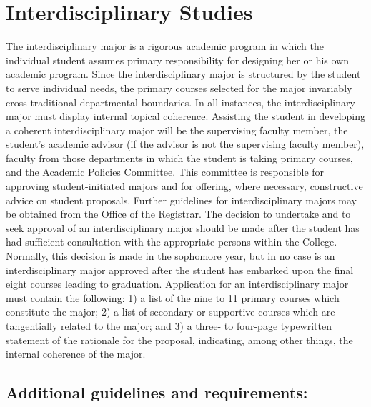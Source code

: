 \documentclass[
  letterpaper,
]{scrbook}
\begin{document}
\section{Interdisciplinary Studies}\label{sec-interdisciplinary-studies}

The interdisciplinary major is a rigorous academic program in which the
individual student assumes primary responsibility for designing her or
his own academic program. Since the interdisciplinary major is
structured by the student to serve individual needs, the primary courses
selected for the major invariably cross traditional departmental
boundaries. In all instances, the interdisciplinary major must display
internal topical coherence. Assisting the student in developing a
coherent interdisciplinary major will be the supervising faculty member,
the student's academic advisor (if the advisor is not the supervising
faculty member), faculty from those departments in which the student is
taking primary courses, and the Academic Policies Committee. This
committee is responsible for approving student-initiated majors and for
offering, where necessary, constructive advice on student proposals.
Further guidelines for interdisciplinary majors may be obtained from the
Office of the Registrar. The decision to undertake and to seek approval
of an interdisciplinary major should be made after the student has had
sufficient consultation with the appropriate persons within the College.
Normally, this decision is made in the sophomore year, but in no case is
an interdisciplinary major approved after the student has embarked upon
the final eight courses leading to graduation. Application for an
interdisciplinary major must contain the following: 1) a list of the
nine to 11 primary courses which constitute the major; 2) a list of
secondary or supportive courses which are tangentially related to the
major; and 3) a three- to four-page typewritten statement of the
rationale for the proposal, indicating, among other things, the internal
coherence of the major.

\subsection{Additional guidelines and
requirements:}\label{additional-guidelines-and-requirements}
\end{document}
